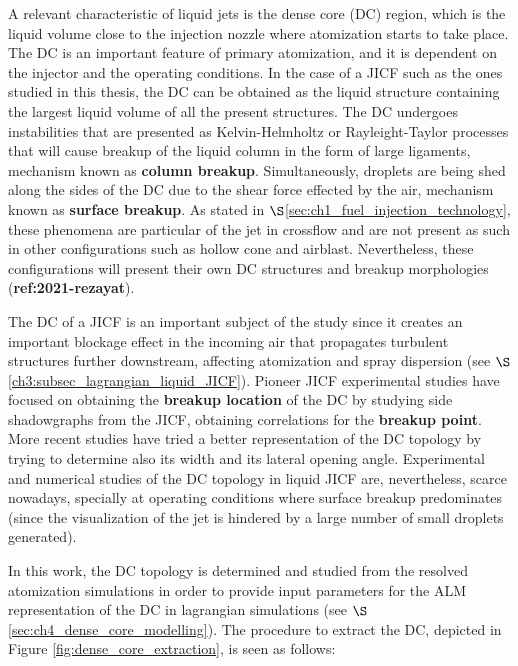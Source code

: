 A relevant characteristic of liquid jets is the dense core (DC) region, which is the liquid volume close to the injection nozzle where atomization starts to take place. The DC is an important feature of primary atomization, and it is dependent on the injector and the operating conditions. In the case of a JICF such as the ones studied in this thesis, the DC can be obtained as the liquid structure containing the largest liquid volume of all the present structures. The DC undergoes instabilities that are presented as Kelvin-Helmholtz or Rayleight-Taylor processes that will cause breakup of the liquid column in the form of large ligaments, mechanism known as \textbf{column breakup}. Simultaneously, droplets are being shed along the sides of the DC due to the shear force effected by the air, mechanism known as \textbf{surface breakup}. As stated in $\S$\ref{sec:ch1_fuel_injection_technology}, these phenomena are particular of the jet in crossflow and are not present as such in other configurations such as hollow cone and airblast. Nevertheless, these configurations will present their own DC structures and breakup morphologies (\textbf{ref:2021-rezayat}).

The DC of a JICF is an important subject of the study since it creates an important blockage effect in the incoming air that propagates turbulent structures further downstream, affecting atomization and spray dispersion (see $\S$\ref{ch3:subsec_lagrangian_liquid_JICF}). Pioneer JICF experimental studies \citepColor[wu_breakup_1997] have focused on obtaining the \textbf{breakup location} of the DC by studying side shadowgraphs from the JICF, obtaining correlations for the \textbf{breakup point}. More recent studies  have tried a better representation of the DC topology by trying to determine also its width and its lateral opening angle. Experimental and numerical studies of the DC topology in liquid JICF are, nevertheless, scarce nowadays, specially at operating conditions where surface breakup predominates (since the visualization of the jet is hindered by a large number of small droplets generated).

In this work, the DC topology is determined and studied from the resolved atomization simulations in order to provide input parameters for the ALM representation of the DC in lagrangian simulations (see $\S$\ref{sec:ch4_dense_core_modelling}). The procedure to extract the DC, depicted in Figure \ref{fig:dense_core_extraction}, is seen as follows:

